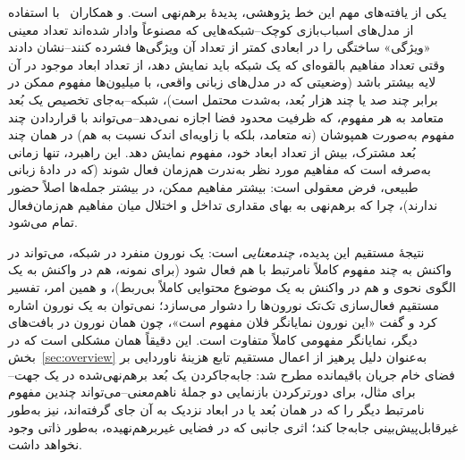 یکی از یافته‌های مهم این خط پژوهشی، پدیدهٔ برهم‌نهی
است.
و همکاران~\cite{elhage2022superposition}
با استفاده از مدل‌های اسباب‌بازی
کوچک--شبکه‌هایی که مصنوعاً وادار شده‌اند تعداد معینی «ویژگی» ساختگی را در ابعادی کمتر از تعداد آن ویژگی‌ها فشرده کنند--نشان دادند وقتی تعداد مفاهیم بالقوه‌ای که یک شبکه باید نمایش دهد، از تعداد ابعاد موجود در آن لایه بیشتر باشد (وضعیتی که در مدل‌های زبانی واقعی، با میلیون‌ها مفهوم ممکن در برابر چند صد یا چند هزار بُعد، به‌شدت محتمل است)، شبکه--به‌جای تخصیص یک بُعد متعامد به هر مفهوم، که ظرفیت محدود فضا اجازه نمی‌دهد--می‌تواند با قراردادن چند مفهوم به‌صورت همپوشان (نه متعامد، بلکه با زاویه‌ای اندک نسبت به هم) در همان چند بُعد مشترک، بیش از تعداد ابعاد خود، مفهوم نمایش دهد. این راهبرد، تنها زمانی به‌صرفه است که مفاهیم مورد نظر به‌ندرت هم‌زمان فعال شوند (که در دادهٔ زبانی طبیعی، فرض معقولی است: بیشتر مفاهیم ممکن، در بیشتر جمله‌ها اصلاً حضور ندارند)، چرا که برهم‌نهی به بهای مقداری تداخل و اختلال میان مفاهیم هم‌زمان‌فعال تمام می‌شود.

نتیجهٔ مستقیم این پدیده، \emph{چندمعنایی}
است: یک نورون منفرد در شبکه، می‌تواند در واکنش به چند مفهوم کاملاً نامرتبط با هم فعال شود (برای نمونه، هم در واکنش به یک الگوی نحوی و هم در واکنش به یک موضوع محتوایی کاملاً بی‌ربط)، و همین امر، تفسیر مستقیم فعال‌سازی تک‌تک نورون‌ها را دشوار می‌سازد؛ نمی‌توان به یک نورون اشاره کرد و گفت «این نورون نمایانگر فلان مفهوم است»، چون همان نورون در بافت‌های دیگر، نمایانگر مفهومی کاملاً متفاوت است. این دقیقاً همان مشکلی است که در بخش~\ref{sec:overview} به‌عنوان دلیل پرهیز از اعمال مستقیم تابع هزینهٔ ناوردایی بر فضای خام جریان باقیمانده مطرح شد: جابه‌جاکردن یک بُعد برهم‌نهی‌شده در یک جهت--برای مثال، برای دورترکردن بازنمایی دو جملهٔ ناهم‌معنی--می‌تواند چندین مفهوم نامرتبط دیگر را که در همان بُعد یا در ابعاد نزدیک به آن جای گرفته‌اند، نیز به‌طور غیرقابل‌پیش‌بینی جابه‌جا کند؛ اثری جانبی که در فضایی غیربرهم‌نهیده، به‌طور ذاتی وجود نخواهد داشت.

